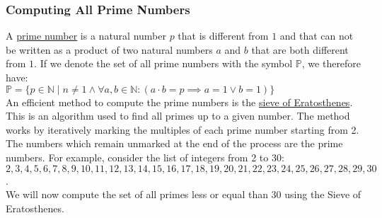\documentclass[11pt]{report}
\newcommand{\ds}{\displaystyle}
\begin{document}
\subsubsection{Computing All Prime Numbers}
A \href{https://en.wikipedia.org/wiki/Prime_number}{prime number} is a natural number $p$ that is different from $1$
and that can not be written as a product of two natural numbers $a$ and $b$ that are both different from $1$.  If
we denote the set of all prime numbers with the symbol $\mathbb{P}$, we therefore have:
\\[0.2cm]
\hspace*{1.3cm}
$\ds \mathbb{P} = \bigl\{ p \in \mathbb{N} \mid n \not= 1 \wedge \forall a, b \in \mathbb{N}:(a \cdot b = p
\implies a = 1 \vee b = 1) \bigr\}$
\\[0.2cm]
An efficient method to compute the prime numbers is the
\href{https://en.wikipedia.org/wiki/Sieve_of_Eratosthenes}{sieve of Eratosthenes}.
This is an algorithm used to find all primes up to a given number. The method works by iteratively marking the
multiples of each prime number starting from 2. The numbers which remain unmarked at the end of the process are
the prime numbers.  For example, consider the list of integers from 2 to 30:
\\[0.2cm]
\hspace*{0.3cm}
$2, 3, 4, 5, 6, 7, 8, 9, 10, 11, 12, 13, 14, 15, 16, 17, 18, 19, 20, 21, 22, 23, 24, 25, 26, 27, 28, 29, 30$.
\\[0.2cm]
We will now compute the set of all primes less or equal than 30 using the Sieve of Eratosthenes.
\end{document}
